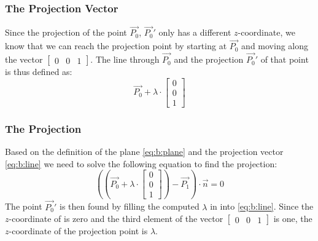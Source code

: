 	\subsubsection*{The Projection Vector}
		Since the projection of the point $\vec{P_0}$, $\vec{P_0}'$ only has a different $z$-coordinate, we know that we can reach the projection point by starting at $\vec{P_0}$ and moving along the vector $\begin{bmatrix}0 &0 &1\end{bmatrix}$. The line through $\vec{P_0}$ and the projection $\vec{P_0}'$ of that point is thus defined as:
			\begin{equation}\label{eq:b:line}
			 	\vec{P_0} + \lambda \cdot \begin{bmatrix} 0\\ 0\\ 1\end{bmatrix}
			 \end{equation} 

	\subsubsection*{The Projection}
		Based on the definition of the plane \eqref{eq:b:plane} and the projection vector \eqref{eq:b:line} we need to solve the following equation to find the projection:
			\begin{equation}\label{eq:b:projection}
				\left( \left(\vec{P_0} + \lambda \cdot  \begin{bmatrix} 0\\ 0\\ 1\end{bmatrix} \right) - \vec{P_1} \right) \cdot \vec{n} = 0
			\end{equation}
		The point $\vec{P_0}'$ is then found by filling the computed $\lambda$ in into \autoref{eq:b:line}. Since the $z$-coordinate of  is zero and the third element of the vector $\begin{bmatrix}0 &0 &1\end{bmatrix}$ is one, the $z$-coordinate of the projection point is $\lambda$.\\

